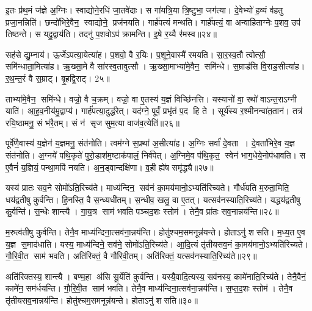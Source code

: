 इ॒तः प्र॑थ॒मं ज॑ज्ञे अ॒ग्निः। स्वाद्योने॒रधि॑ जा॒तवे॑दाः। स गा॑यत्रि॒या त्रि॒ष्टुभा॒ जग॑त्या। दे॒वेभ्यो॑ ह॒व्यं व॑हतु प्रजा॒नन्निति॑। छन्दो॑भिरे॒वैन॒ स्वाद्योने॒ प्रज॑नयति। गार्\mbox{}ह॑पत्यं मन्थति। गार्\mbox{}ह॑पत्यं॒ वा अन्वाहि॑ताग्नेः प॒शव॒ उप॑ तिष्ठन्ते। स यदु॒द्वाय॑ति। तदनु॑ प॒शवोऽप॑ क्रामन्ति। इ॒षे र॒य्यै र॑मस्व॥२४॥

सह॑से द्यु॒म्नाय॑। ऊ॒र्जेऽपत्या॒येत्या॑ह। प॒शवो॒ वै र॒यिः। प॒शूने॒वास्मै॑ रमयति। सा॒र॒स्व॒तौ त्वोत्सौ॒ समि॑न्धाता॒मित्या॑ह। ऋ॒ख्सा॒मे वै सा॑रस्व॒तावुत्सौ। ऋ॒ख्सा॒माभ्या॑मे॒वैन॒ समि॑न्धे। स॒म्राड॑सि वि॒राड॒सीत्या॑ह। र॒थ॒न्त॒रं वै स॒म्राट्। बृ॒हद्वि॒राट्। 2५॥

ताभ्या॑मे॒वैन॒ समि॑न्धे। वज्रो॒ वै च॒क्रम्। वज्रो॒ वा ए॒तस्य॑ य॒ज्ञं विच्छि॑नत्ति। यस्यानो॑ वा॒ रथो॑ वाऽन्त॒राऽग्नी याति॑। आ॒ह॒व॒नीय॑मु॒द्वाप्य॑। गार्\mbox{}ह॑पत्या॒दुद्ध॑रेत्। यद॑ग्ने॒ पूर्वं॒ प्रभृ॑तं प॒द हि ते। सूर्य॑स्य र॒श्मीनन्वा॑त॒तान॑। तत्र॑ रयि॒ष्ठामनु॒ सं भ॑रै॒तम्। सं न॑ सृज सुम॒त्या वाज॑व॒त्येति॑॥२६॥

पूर्वे॑णै॒वास्य॑ य॒ज्ञेन॑ य॒ज्ञमनु॒ संत॑नोति। त्वम॑ग्ने स॒प्रथा॑ अ॒सीत्या॑ह। अ॒ग्निः सर्वा॑ दे॒वता। दे॒वता॑भिरे॒व य॒ज्ञ संत॑नोति। अ॒ग्नये॑ पथि॒कृते॑ पुरो॒डाश॑म॒ष्टाक॑पालं॒ निर्व॑पेत्। अ॒ग्निमे॒व प॑थि॒कृत॒ स्वेन॑ भाग॒धेये॒नोप॑धावति। स ए॒वैनं॑ य॒ज्ञियं॒ पन्था॒मपि॑ नयति। अ॒न॒ड्वान्दक्षि॑णा। व॒ही ह्ये॑ष समृ॑द्ध्यै॥२७॥

यस्य॑ प्रातः सव॒ने सोमो॑ऽति॒रिच्य॑ते। माध्य॑न्दिन॒ सव॑नं का॒मय॑मानो॒ऽभ्यति॑रिच्यते। गौर्ध॑यति म॒रुता॒मिति॒ धय॑द्वतीषु कुर्वन्ति। हि॒नस्ति॒ वै स॒न्ध्यधी॑तम्। स॒न्धीव॒ खलु॒ वा ए॒तत्। यत्सव॑नस्याति॒रिच्य॑ते। यद्धय॑द्वतीषु कु॒र्वन्ति॑। स॒न्धेः शान्त्यै। गा॒य॒त्र साम॑ भवति पञ्चद॒शः स्तोम॑। तेनै॒व प्रा॑तः सव॒नान्नय॑न्ति॥२८॥

म॒रुत्व॑तीषु कुर्वन्ति। तेनै॒व माध्य॑न्दिना॒त्सव॑ना॒न्नय॑न्ति। होतु॑श्चम॒समनून्न॑यन्ते। होताऽनु॑ शसति। म॒ध्य॒त ए॒व य॒ज्ञ स॒माद॑धाति। यस्य॒ माध्य॑न्दिने॒ सव॑ने॒ सोमो॑ऽति॒रिच्य॑ते। आ॒दि॒त्यं तृ॑तीयसव॒नं का॒मय॑मानो॒ऽभ्यति॑रिच्यते। गौ॒रि॒वी॒त साम॑ भवति। अति॑रिक्तं॒ वै गौ॑रिवी॒तम्। अति॑रिक्तं॒ यत्सव॑नस्याति॒रिच्य॑ते॥२९॥

अति॑रिक्तस्य॒ शान्त्यै। बण्म॒हा अ॑सि सू॒र्येति॑ कुर्वन्ति। यस्यै॒वादि॒त्यस्य॒ सव॑नस्य॒ कामे॑नाति॒रिच्य॑ते। तेनै॒वैनं॒ कामे॑न॒ सम॑र्धयन्ति। गौ॒रि॒वी॒त साम॑ भवति। तेनै॒व माध्य॑न्दिना॒त्सव॑ना॒न्नय॑न्ति। स॒प्त॒द॒शः स्तोम॑। तेनै॒व तृ॑तीयसव॒नान्नय॑न्ति। होतु॑श्चम॒समनून्न॑यन्ते। होताऽनु॑ शसति॥३०॥

